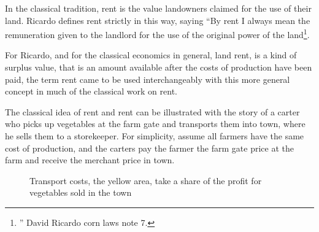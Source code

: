 
In the classical tradition, rent is the value landowners claimed for the use of their land. Ricardo defines rent strictly in this way, saying ``By rent I always mean the remuneration given to the landlord for the use of the original power of the land\footnote{'' David Ricardo corn laws note 7.}. %

For Ricardo, and for the classical economics in general, land rent, is a kind of surplus value, that is an amount available after the costs of production have been paid, the term rent came to be used interchangeably with this more general concept in much of the classical work on rent.

The classical idea of rent and rent can be illustrated with the story of a carter who picks up vegetables at the farm gate and transports them into town, where he sells them to a  storekeeper. %
For simplicity, assume all farmers have the same cost of production, and the carters pay the farmer the farm gate price at the farm and receive the merchant price in town. 

\begin{figure}
    \begin{center}
    
    \caption{Transport costs, the yellow area, take a share of the profit for vegetables sold in the town}
    \label{fig-rent-ricardo}
    \end{center}
\end{figure}

